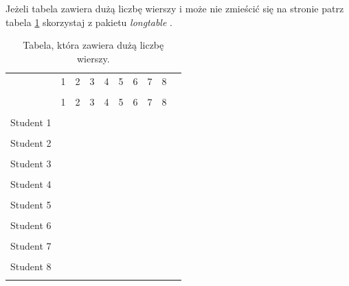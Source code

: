 \documentclass{agh-wi} %
\begin{document}
Jeżeli tabela zawiera dużą liczbę wierszy i może nie zmieścić się na stronie \pauza patrz tabela \ref{tab:longtable} \pauza skorzystaj z pakietu \emph{longtable} \cite{longtable}.
\begin{longtable}{|p{14ex}|p{1.5em}|p{1.5em}|p{1.5em}|p{1.5em}|p{1.5em}|p{1.5em}|p{1.5em}|p{1.5em}|p{1.5em}|}
    \caption{Tabela, która zawiera dużą liczbę wierszy\label{tab:longtable}.}
    \endfirsthead
    \hline
              & 1 & 2 & 3 & 4 & 5 & 6 & 7 & 8 & \\
    \cline{2-9}
              &   &   &   &   &   &   &   &   & \\
    \hline
    \endhead
    \endfoot
    \hline\hline
              & 1 & 2 & 3 & 4 & 5 & 6 & 7 & 8 & \\
    \cline{2-9}
              &   &   &   &   &   &   &   &   & \\
    \hline\hline
    Student 1 &   &   &   &   &   &   &   &   & \\
    \cline{2-9}
              &   &   &   &   &   &   &   &   & \\
    \hline\hline
    Student 2 &   &   &   &   &   &   &   &   & \\
    \cline{2-9}
              &   &   &   &   &   &   &   &   & \\
    \hline\hline
    Student 3 &   &   &   &   &   &   &   &   & \\
    \cline{2-9}
              &   &   &   &   &   &   &   &   & \\
    \hline\hline
    Student 4 &   &   &   &   &   &   &   &   & \\
    \cline{2-9}
              &   &   &   &   &   &   &   &   & \\
    \hline\hline
    Student 5 &   &   &   &   &   &   &   &   & \\
    \cline{2-9}
              &   &   &   &   &   &   &   &   & \\
    \hline\hline
    Student 6 &   &   &   &   &   &   &   &   & \\
    \cline{2-9}
              &   &   &   &   &   &   &   &   & \\
    \hline\hline
    Student 7 &   &   &   &   &   &   &   &   & \\
    \cline{2-9}
              &   &   &   &   &   &   &   &   & \\
    \hline\hline
    Student 8 &   &   &   &   &   &   &   &   & \\
    \cline{2-9}
              &   &   &   &   &   &   &   &   & \\

\end{longtable}
\end{document}

